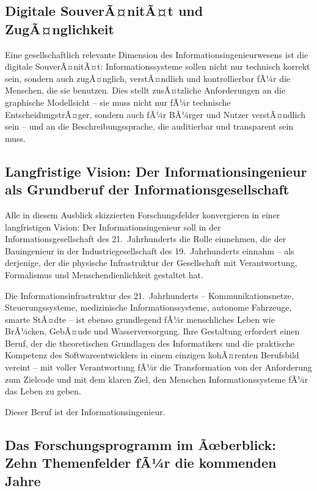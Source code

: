 ﻿\documentclass[a4paper,12pt]{report}
\theoremstyle{definition}
\begin{document}
\subsection{Digitale SouverÃ¤nitÃ¤t und ZugÃ¤nglichkeit}

Eine gesellschaftlich relevante Dimension des Informationsingenieurwesens ist die
digitale SouverÃ¤nitÃ¤t: Informationssysteme sollen nicht nur technisch korrekt sein,
sondern auch zugÃ¤nglich, verstÃ¤ndlich und kontrollierbar fÃ¼r die Menschen, die sie
benutzen. Dies stellt zusÃ¤tzliche Anforderungen an die graphische Modellsicht --
sie muss nicht nur fÃ¼r technische EntscheidungstrÃ¤ger, sondern auch fÃ¼r BÃ¼rger und
Nutzer verstÃ¤ndlich sein -- und an die Beschreibungssprache, die auditierbar und
transparent sein muss.

\subsection{Langfristige Vision: Der Informationsingenieur als Grundberuf der Informationsgesellschaft}

Alle in diesem Ausblick skizzierten Forschungsfelder konvergieren in einer
langfristigen Vision: Der Informationsingenieur soll in der Informationsgesellschaft
des 21.~Jahrhunderts die Rolle einnehmen, die der Bauingenieur in der Industriegesellschaft
des 19.~Jahrhunderts einnahm -- als derjenige, der die physische Infrastruktur der
Gesellschaft mit Verantwortung, Formalismus und Menschendienlichkeit gestaltet hat.

Die Informationsinfrastruktur des 21.~Jahrhunderts -- Kommunikationsnetze, Steuerungssysteme,
medizinische Informationssysteme, autonome Fahrzeuge, smarte StÃ¤dte -- ist ebenso
grundlegend fÃ¼r menschliches Leben wie BrÃ¼cken, GebÃ¤ude und Wasserversorgung.
Ihre Gestaltung erfordert einen Beruf, der die theoretischen Grundlagen des Informatikers
und die praktische Kompetenz des Softwareentwicklers in einem einzigen kohÃ¤renten
Berufsbild vereint -- mit voller Verantwortung fÃ¼r die Transformation von der
Anforderung zum Zielcode und mit dem klaren Ziel, den Menschen Informationssysteme
fÃ¼r das Leben zu geben.

Dieser Beruf ist der Informationsingenieur.

\subsection{Das Forschungsprogramm im Ãœberblick: Zehn Themenfelder fÃ¼r die kommenden Jahre}
\label{sec:forschungsprogramm}
\end{document}
